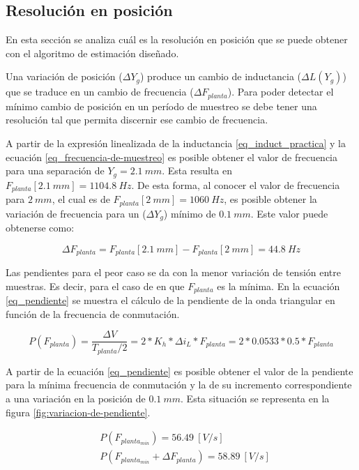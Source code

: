 \subsection{Resolución en posición}

En esta sección se analiza cuál es la resolución en posición que se puede obtener con el algoritmo de estimación diseñado.

Una variación de posición ($\Delta Y_g$) produce un cambio de inductancia ($\Delta L(Y_g)$) que se traduce en un cambio de frecuencia ($\Delta F_{planta}$). Para poder detectar el mínimo cambio de posición en un período de muestreo se debe tener una resolución tal que permita discernir ese cambio de frecuencia.


A partir de la expresión linealizada de la inductancia \ref{eq_induct_practica} y la ecuación \ref{eq_frecuencia-de-muestreo} es posible obtener el valor de frecuencia para una separación de $Y_g=2.1\:mm$. Esta resulta en $F_{planta}[2.1\:mm] = 1104.8\:Hz$. De esta forma, al conocer el valor de frecuencia para $2\:mm$, el cual es de $F_{planta}[2\:mm] = 1060\:Hz$, es posible obtener la variación de frecuencia para un ($\Delta Y_g$) mínimo de  $0.1\:mm$. Este valor puede obtenerse como:

\begin{equation} 
	\Delta F_{planta} = F_{planta}[2.1\:mm] - F_{planta}[2\:mm] = 44.8\:Hz
\end{equation}

 Las pendientes para el peor caso se da con la menor variación de tensión entre muestras. Es decir, para el caso de en que $F_{planta}$ es la mínima. En la ecuación \ref{eq_pendiente} se muestra el cálculo de la pendiente de la onda triangular en función de la frecuencia de conmutación.

\begin{equation} \label{eq_pendiente}
	P(F_{planta}) = \frac{\Delta V}{T_{planta}/2} = 2*K_h*\Delta i_L*F_{planta} = 2 * 0.0533 * 0.5 * F_{planta}
\end{equation}

 A partir de la ecuación \ref{eq_pendiente} es posible obtener el valor de la pendiente para la mínima frecuencia de conmutación y la de su incremento correspondiente a una variación en la posición de $0.1\:mm$. Esta situación se representa en la figura \ref{fig:variacion-de-pendiente}.

\begin{equation} 
	\begin{aligned}
		&P(F_{planta_{min}}) = 56.49\:[V/s] \\
		&P(F_{planta_{min}} + \Delta F_{planta}) = 58.89\:[V/s] \\
	\end{aligned}
\end{equation}

